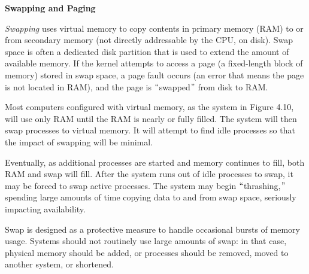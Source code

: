 \documentclass[12pt]{article}
\begin{document}
\begin{adjustwidth}{0.25in}{0.0in}
{\fontsize{18pt}{21.6pt}\selectfont \textbf{Swapping and Paging}\par}\par

\end{adjustwidth}

\begin{adjustwidth}{0.25in}{0.0in}
{\fontsize{16pt}{19.2pt}\selectfont \textit{Swapping} uses virtual memory to copy contents in primary memory (RAM) to or from secondary memory (not directly addressable by the CPU, on disk). Swap space is often a dedicated disk partition that is used to extend the amount of available memory. If the kernel attempts to access a page (a fixed-length block of memory) stored in swap space, a page fault occurs (an error that means the page is not located in RAM), and the page is $``$swapped$"$  from disk to RAM.\par}\par

\end{adjustwidth}

\begin{adjustwidth}{0.25in}{0.0in}
{\fontsize{16pt}{19.2pt}\selectfont Most computers configured with virtual memory, as the system in Figure 4.10, will use only RAM until the RAM is nearly or fully filled. The system will then swap processes to virtual memory. It will attempt to find idle processes so that the impact of swapping will be minimal.\par}\par

\end{adjustwidth}

\begin{adjustwidth}{0.25in}{0.0in}
{\fontsize{16pt}{19.2pt}\selectfont Eventually, as additional processes are started and memory continues to fill, both RAM and swap will fill. After the system runs out of idle processes to swap, it may be forced to swap active processes. The system may begin $``$thrashing,$"$  spending large amounts of time copying data to and from swap space, seriously impacting availability.\par}\par

\end{adjustwidth}

\begin{adjustwidth}{0.25in}{0.0in}
{\fontsize{16pt}{19.2pt}\selectfont Swap is designed as a protective measure to handle occasional bursts of memory usage. Systems should not routinely use large amounts of swap: in that case, physical memory should be added, or processes should be removed, moved to another system, or shortened.\par}\par

\end{adjustwidth}
\end{document}
